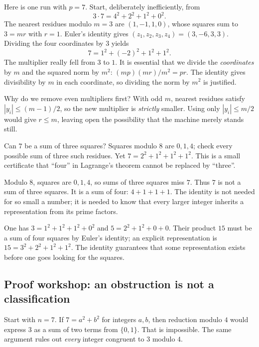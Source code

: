 Here is one run with $p=7$. Start, deliberately inefficiently, from
\[
3\cdot7=4^2+2^2+1^2+0^2.
\]
The nearest residues modulo $m=3$ are $(1,-1,1,0)$, whose squares sum to $3=mr$ with $r=1$. Euler's identity gives $(z_1,z_2,z_3,z_4)=(3,-6,3,3)$. Dividing the four coordinates by $3$ yields
\[
7=1^2+(-2)^2+1^2+1^2.
\]
The multiplier really fell from $3$ to $1$. It is essential that we divide the \emph{coordinates} by $m$ and the squared norm by $m^2$: $(mp)(mr)/m^2=pr$. The identity gives divisibility by $m$ in each coordinate, so dividing the norm by $m^2$ is justified.

Why do we remove even multipliers first? With odd $m$, nearest residues satisfy $|y_i|\le(m-1)/2$, so the new multiplier is \emph{strictly} smaller. Using only $|y_i|\le m/2$ would give $r\le m$, leaving open the possibility that the machine merely stands still.

\begin{think}
Can $7$ be a sum of three squares? Squares modulo $8$ are $0,1,4$; check every possible sum of three such residues. Yet $7=2^2+1^2+1^2+1^2$. This is a small certificate that ``four'' in Lagrange's theorem cannot be replaced by ``three''.
\end{think}

\begin{examplex}
Modulo $8$, squares are $0,1,4$, so sums of three squares miss $7$. Thus $7$ is not a sum of three squares. It is a sum of four: $4+1+1+1$. The identity is not needed for so small a number; it is needed to know that every larger integer inherits a representation from its prime factors.
\end{examplex}

\begin{examplex}
One has $3=1^2+1^2+1^2+0^2$ and $5=2^2+1^2+0+0$. Their product $15$ must be a sum of four squares by Euler's identity; an explicit representation is $15=3^2+2^2+1^2+1^2$. The identity guarantees that some representation exists before one goes looking for the squares.
\end{examplex}

\subsection*{Proof workshop: an obstruction is not a classification}

Start with $n=7$. If $7=a^2+b^2$ for integers $a,b$,
then reduction modulo $4$ would express $3$ as a sum
of two terms from $\{0,1\}$. That is impossible. The same
argument rules out \emph{every} integer congruent to
$3$ modulo $4$.

